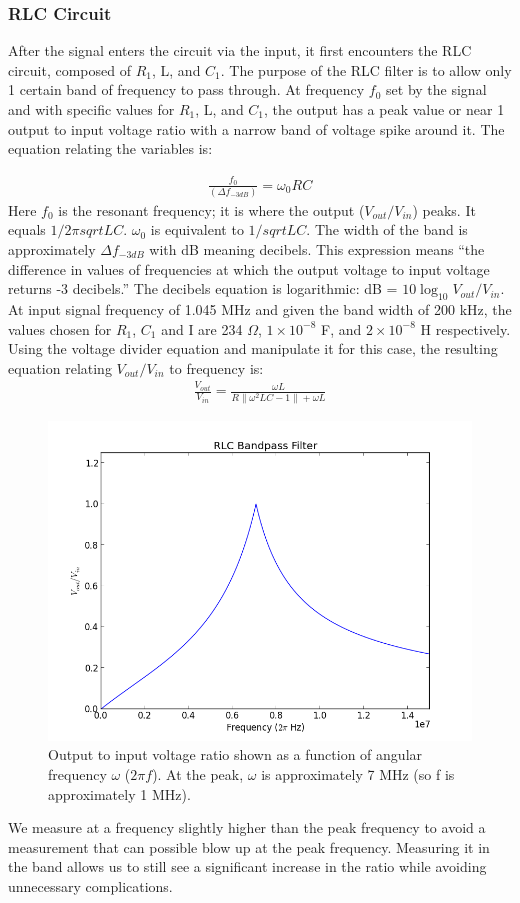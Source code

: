 \documentclass[12pt]{article}
\begin{document}
\subsubsection{RLC Circuit}
After the signal enters the circuit via the input, it first encounters
the RLC circuit, composed of $R_{1}$, L, and $C_{1}$. The purpose of the RLC
filter is to allow only 1 certain band of frequency to pass through. At frequency $f_{0}$ set by the
signal and with specific values for $R_{1}$, L, and $C_{1}$, the output has a peak
value or near 1 output to input voltage ratio with a narrow band of voltage spike around it. The
equation relating the variables is:

\begin{align} \frac{f_{0}}{(\Delta{f_{-3dB}})} =
  \omega_{0}RC\end{align}
Here $f_{0}$ is the resonant frequency; it is where the output
($V_{out}/V_{in}$) peaks. It equals $1/2\pi{sqrt{LC}}$. $\omega_{0}$ is
equivalent to $1/sqrt{LC}$. The width of the band is approximately
$\Delta{f_{-3dB}}$ with dB meaning decibels. This expression means 
``the difference in values of frequencies at which the
output voltage to input voltage returns -3 decibels.'' The decibels
equation is logarithmic: dB = $10\log_{10} V_{out}/V_{in}$. At input
signal frequency of 1.045 MHz and given the band width of 200 kHz, the
values chosen for $R_{1}$, $C_{1}$ and I are 234 $\Omega$, $1\times{10^{-8}}$
F, and $2\times{10^{-8}}$ H respectively. Using the voltage divider
equation and manipulate it for this case, the resulting equation
relating $V_{out}/V_{in}$ to frequency is:
\begin{align}\frac{V_{out}}{V_{in}} =
  \frac{\omega{L}}{R\|{\omega}^{2}{LC} - 1\| + \omega{L}}\end{align}
\begin{figure}[H]
\centering
\includegraphics[width=.95\textwidth]{RLC_filter.png}
\caption{Output to input voltage ratio shown as a function of angular
  frequency $\omega$ ($2\pi{f}$). At the peak, $\omega$ is approximately
  7 MHz (so f is approximately 1 MHz).} 
\end{figure}
We measure at a frequency slightly higher than the peak frequency to
avoid a measurement that can possible blow up at the peak
frequency. Measuring it in the band allows us to still see a significant
increase in the ratio while avoiding unnecessary complications.
\end{document}
